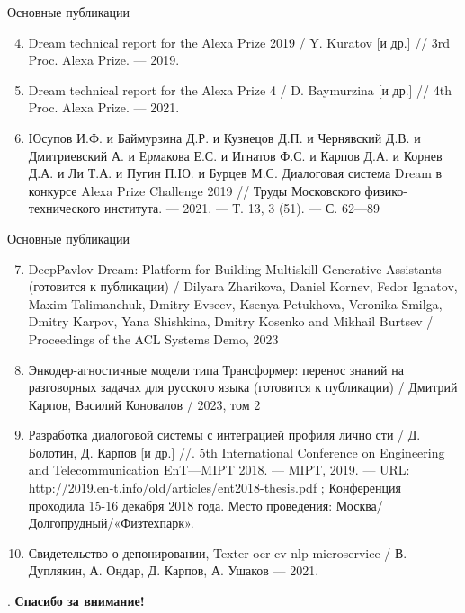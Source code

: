 \begin{frame}{Основные публикации}
\begin{enumerate}
\setcounter{enumi}{3}
\item Dream technical report for the Alexa Prize 2019 / Y. Kuratov
[и др.] // 3rd Proc. Alexa Prize. — 2019.
\item Dream technical report for the Alexa Prize 4  / D. Baymurzina
[и др.] // 4th Proc. Alexa Prize. — 2021.
\item Юсупов И.Ф. и Баймурзина Д.Р. и Кузнецов Д.П. и Чернявский Д.В. и Дмитриевский А. и Ермакова Е.С. и Игнатов Ф.С. и Карпов Д.А. и Корнев Д.А. и Ли Т.А. и Пугин П.Ю. и Бурцев М.С. Диалоговая система Dream в конкурсе Alexa
Prize Challenge 2019 // Труды Московского физико-технического
института. — 2021. — Т. 13, 3 (51). — С. 62—89
\end{enumerate}
\end{frame}
\begin{frame}{Основные публикации}
\begin{enumerate}
\setcounter{enumi}{6}
\item DeepPavlov Dream: Platform for Building Multiskill Generative Assistants (готовится к публикации) / Dilyara Zharikova, Daniel Kornev, Fedor Ignatov, Maxim Talimanchuk, Dmitry Evseev, Ksenya Petukhova, Veronika Smilga, Dmitry Karpov, Yana Shishkina, Dmitry Kosenko and Mikhail Burtsev / Proceedings of the ACL Systems Demo, 2023
\item Энкодер-агностичные модели типа Трансформер: перенос знаний на разговорных задачах для русского языка (готовится к публикации) / Дмитрий Карпов, Василий Коновалов / 2023, том 2
\item Разработка диалоговой системы с интеграцией профиля лично
сти  / Д. Болотин, Д. Карпов [и др.] //. 5th International Conference
on Engineering and Telecommunication EnT—MIPT 2018. — MIPT,
2019. — URL: http://2019.en-t.info/old/articles/ent2018-thesis.pdf ;
Конференция проходила 15-16 декабря 2018 года. Место проведения:
Москва/Долгопрудный/«Физтехпарк».
\item Свидетельство о депонировании, Texter ocr-cv-nlp-microservice / В. Дуплякин, А. Ондар, Д. Карпов, А. Ушаков — 2021.
\end{enumerate}    
\end{frame}

\begin{frame}{.}
\centering
\Large \textbf{Спасибо за внимание!}
\end{frame}

